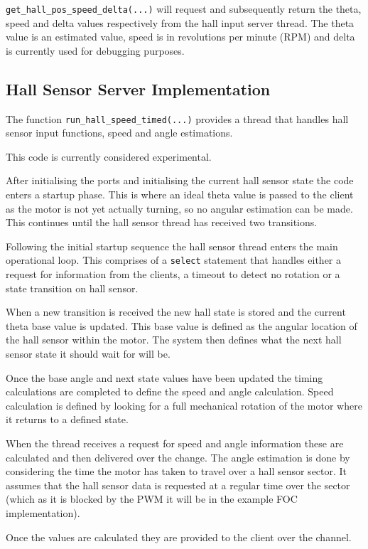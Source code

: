 \verb=get_hall_pos_speed_delta(...)= will request and subsequently return the theta, speed and delta values respectively from the hall input server thread. The theta value is an estimated value, speed is in revolutions per minute (RPM) and delta is currently used for debugging purposes.

\subsection{Hall Sensor Server Implementation}
The function \verb=run_hall_speed_timed(...)= provides a thread that handles hall sensor input functions, speed and angle estimations.

This code is currently considered experimental. 

After initialising the ports and initialising the current hall sensor state the code enters a startup phase. This is where an ideal theta value is passed to the client as the motor is not yet actually turning, so no angular estimation can be made. This continues until the hall sensor thread has received two transitions. 

Following the initial startup sequence the hall sensor thread enters the main operational loop. This comprises of a \verb=select= statement that handles either a request for information from the clients, a timeout to detect no rotation or a state transition on hall sensor.

When a new transition is received the new hall state is stored and the current theta base value is updated. This base value is defined as the angular location of the hall sensor within the motor. The system then defines what the next hall sensor state it should wait for will be.

Once the base angle and next state values have been updated the timing calculations are completed to define the speed and angle calculation. Speed calculation is defined by looking for a full mechanical rotation of the motor where it returns to a defined state.

When the thread receives a request for speed and angle information these are calculated and then delivered over the change. The angle estimation is done by considering the time the motor has taken to travel over a hall sensor sector. It assumes that the hall sensor data is requested at a regular time over the sector (which as it is blocked by the PWM it will be in the example FOC implementation).

Once the values are calculated they are provided to the client over the channel.
